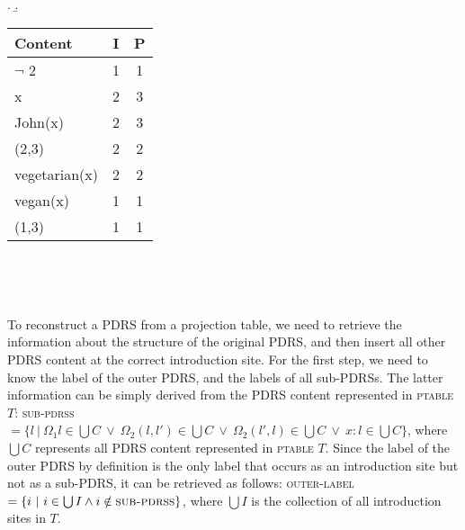 \hspace*{0.8cm}\begin{minipage}{\linewidth}
\begin{multicols}{2}
  \a. 
        \b. \vspace*{1pt}\small \begin{tabular}{| l | c | c |}
      \hline
      Content & I & P\\
      \hline
     $\neg$ 2 & 1 & 1\\
            x & 2 & 3\\
      John(x) & 2 & 3\\
        (2,3) & 2 & 2\\
vegetarian(x) & 2 & 2\\
     vegan(x) & 1 & 1\\
        (1,3) & 1 & 1\\
      \hline
    \end{tabular}\\\vspace*{1pt}

\end{multicols}
\end{minipage}\\

\noindent %

To reconstruct a PDRS from a projection table, we need to
retrieve the information about the structure of the original PDRS,
and then insert all other PDRS content at the correct introduction site. For
the first step, we need to know the label of the outer PDRS, and the labels
of all sub-PDRSs. The latter information can be simply derived from the PDRS
content represented in \textsc{ptable} $T$: \textsc{sub-pdrss} $=\{l~|~\Omega_1
  l \in \bigcup C ~\vee~ \Omega_2(l,l') \in \bigcup C ~\vee~ \Omega_2(l',l) \in
\bigcup C ~\vee~ x:l \in \bigcup C \}$, where $\bigcup C$ represents all
PDRS content represented in \textsc{ptable} $T$. Since the label of the
outer PDRS by definition is the only label that occurs as an introduction
site but not as a sub-PDRS, it can be retrieved as follows:
\textsc{outer-label} $=\{i~|~i\in\bigcup I \wedge i \notin
\textsc{sub-pdrss}\}$, where $\bigcup I$ is the collection of all
introduction sites in $T$.

